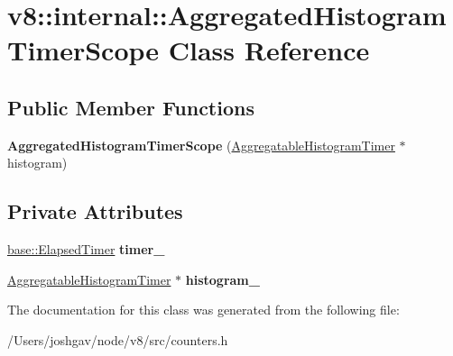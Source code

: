 \hypertarget{classv8_1_1internal_1_1_aggregated_histogram_timer_scope}{}\section{v8\+:\+:internal\+:\+:Aggregated\+Histogram\+Timer\+Scope Class Reference}
\label{classv8_1_1internal_1_1_aggregated_histogram_timer_scope}
\subsection*{Public Member Functions}
\begin{DoxyCompactItemize}
\item 
{\bfseries Aggregated\+Histogram\+Timer\+Scope} (\hyperlink{classv8_1_1internal_1_1_aggregatable_histogram_timer}{Aggregatable\+Histogram\+Timer} $\ast$histogram)\hypertarget{classv8_1_1internal_1_1_aggregated_histogram_timer_scope_abaf836eb7bf83fe4ceeb79a4a5596af0}{}\label{classv8_1_1internal_1_1_aggregated_histogram_timer_scope_abaf836eb7bf83fe4ceeb79a4a5596af0}

\end{DoxyCompactItemize}
\subsection*{Private Attributes}
\begin{DoxyCompactItemize}
\item 
\hyperlink{classv8_1_1base_1_1_elapsed_timer}{base\+::\+Elapsed\+Timer} {\bfseries timer\+\_\+}\hypertarget{classv8_1_1internal_1_1_aggregated_histogram_timer_scope_a79e3e75deaf79d31c18fd6d574e482af}{}\label{classv8_1_1internal_1_1_aggregated_histogram_timer_scope_a79e3e75deaf79d31c18fd6d574e482af}

\item 
\hyperlink{classv8_1_1internal_1_1_aggregatable_histogram_timer}{Aggregatable\+Histogram\+Timer} $\ast$ {\bfseries histogram\+\_\+}\hypertarget{classv8_1_1internal_1_1_aggregated_histogram_timer_scope_acc8dd2854245945227a687c56c756964}{}\label{classv8_1_1internal_1_1_aggregated_histogram_timer_scope_acc8dd2854245945227a687c56c756964}

\end{DoxyCompactItemize}


The documentation for this class was generated from the following file\+:\begin{DoxyCompactItemize}
\item 
/\+Users/joshgav/node/v8/src/counters.\+h\end{DoxyCompactItemize}
